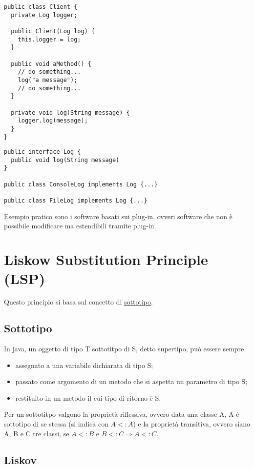 \begin{multicols}{2}
\begin{lstlisting}
public class Client {
  private Log logger;
    
  public Client(Log log) {
    this.logger = log;
  }
    
  public void aMethod() {
    // do something...
    log("a message");
    // do something...
  }

  private void log(String message) {
    logger.log(message);
  }
}
\end{lstlisting}
\columnbreak
\begin{lstlisting}
public interface Log {
  public void log(String message)
}

public class ConsoleLog implements Log {...}

public class FileLog implements Log {...}
\end{lstlisting}  
\end{multicols}

Esempio pratico sono i software basati sui plug-in, ovveri software che non è possibile modificare ma estendibili tramite plug-in.

\section{Liskow Substitution Principle (LSP)}
 
Questo principio si basa sul concetto di \underline{sottotipo}.

\subsection{Sottotipo}

In java, un oggetto di tipo T sottotitpo di S, detto supertipo, può essere sempre
\begin{itemize}
  \item assegnato a una variabile dichiarata di tipo S;
  \item passato come argomento di un metodo che si aspetta un parametro di tipo S;
  \item restituito in un metodo il cui tipo di ritorno è S.
\end{itemize}

Per un sottotitpo valgono la proprietà riflessiva, ovvero data una classe A, A è sottotipo di se stessa (si indica con $A<:A$) e la proprietà transitiva, ovvero siano 
A, B e C tre classi, se $A<:B$ e $B<:C\Rightarrow A<:C$.

\subsection{Liskov}

